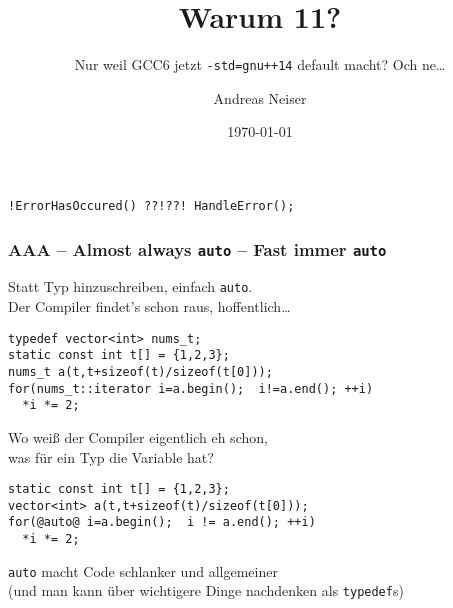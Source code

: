 \documentclass[t,ngerman,usepdftitle=false]{beamer}
\author{Andreas Neiser}
\title{Warum \Cpp{}11?}
\subtitle{Nur weil GCC6 jetzt \lstinline|-std=gnu++14| default macht? Och ne\ldots}
\date{\today}
\begin{document}
\begin{frame}[fragile]
  
    \maketitle
  
  \begin{center}
    \lstinline|!ErrorHasOccured() ??!??! HandleError();|
  \end{center}
\end{frame}


\begin{frame}[fragile]
  \frametitle{AAA -- Almost always \lstinline!auto! -- Fast immer \lstinline!auto! }
  Statt Typ hinzuschreiben, einfach \lstinline!auto!. \\ Der Compiler findet's schon raus, hoffentlich\ldots
  
\begin{lstlisting}
typedef vector<int> nums_t; 
static const int t[] = {1,2,3};
nums_t a(t,t+sizeof(t)/sizeof(t[0])); 
for(nums_t::iterator i=a.begin();  i!=a.end(); ++i)
  *i *= 2;
\end{lstlisting}

Wo weiß der Compiler eigentlich eh schon, \\ was für ein Typ die Variable hat?

\pause 
\begin{lstlisting}
static const int t[] = {1,2,3};
vector<int> a(t,t+sizeof(t)/sizeof(t[0])); 
for(@auto@ i=a.begin();  i != a.end(); ++i)
  *i *= 2;
\end{lstlisting}

\pause 
\begin{block}{}
  \centering
  \lstinline!auto! macht Code schlanker und allgemeiner\\ \small (und man kann über wichtigere Dinge nachdenken als \lstinline|typedef|s) 
\end{block}
  
\end{frame}
\end{document}
